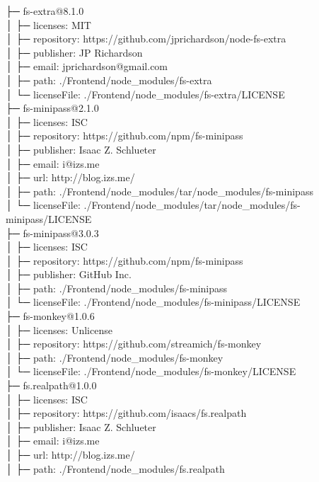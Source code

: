├─ fs-extra@8.1.0\\
│  ├─ licenses: MIT\\
│  ├─ repository: https://github.com/jprichardson/node-fs-extra\\
│  ├─ publisher: JP Richardson\\
│  ├─ email: jprichardson@gmail.com\\
│  ├─ path: ./Frontend/node\_modules/fs-extra\\
│  └─ licenseFile: ./Frontend/node\_modules/fs-extra/LICENSE\\
├─ fs-minipass@2.1.0\\
│  ├─ licenses: ISC\\
│  ├─ repository: https://github.com/npm/fs-minipass\\
│  ├─ publisher: Isaac Z. Schlueter\\
│  ├─ email: i@izs.me\\
│  ├─ url: http://blog.izs.me/\\
│  ├─ path: ./Frontend/node\_modules/tar/node\_modules/fs-minipass\\
│  └─ licenseFile: ./Frontend/node\_modules/tar/node\_modules/fs-minipass/LICENSE\\
├─ fs-minipass@3.0.3\\
│  ├─ licenses: ISC\\
│  ├─ repository: https://github.com/npm/fs-minipass\\
│  ├─ publisher: GitHub Inc.\\
│  ├─ path: ./Frontend/node\_modules/fs-minipass\\
│  └─ licenseFile: ./Frontend/node\_modules/fs-minipass/LICENSE\\
├─ fs-monkey@1.0.6\\
│  ├─ licenses: Unlicense\\
│  ├─ repository: https://github.com/streamich/fs-monkey\\
│  ├─ path: ./Frontend/node\_modules/fs-monkey\\
│  └─ licenseFile: ./Frontend/node\_modules/fs-monkey/LICENSE\\
├─ fs.realpath@1.0.0\\
│  ├─ licenses: ISC\\
│  ├─ repository: https://github.com/isaacs/fs.realpath\\
│  ├─ publisher: Isaac Z. Schlueter\\
│  ├─ email: i@izs.me\\
│  ├─ url: http://blog.izs.me/\\
│  ├─ path: ./Frontend/node\_modules/fs.realpath\\

